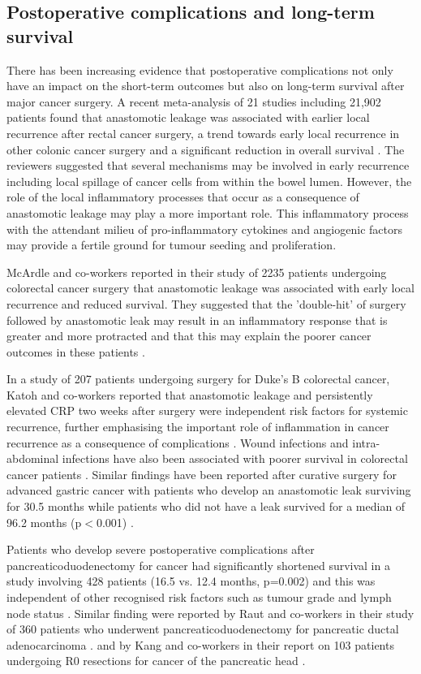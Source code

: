 \subsection{Postoperative complications and long-term survival}
There has been increasing evidence that postoperative complications not only have an impact on the short-term outcomes but also on long-term survival after major cancer surgery. 
A recent meta-analysis of 21 studies including 21,902 patients found that anastomotic leakage was associated with earlier local recurrence after rectal cancer surgery, a trend towards early local recurrence in other colonic cancer surgery and a significant reduction in overall survival \parencite{mirnezami_increased_2011}. 
The reviewers suggested that several mechanisms may be involved in early recurrence including local spillage of cancer cells from within the bowel lumen. 
However, the role of the local inflammatory processes that occur as a consequence of anastomotic leakage may play a more important role. 
This inflammatory process with the attendant milieu of pro-inflammatory cytokines and angiogenic factors may provide a fertile ground for tumour seeding and proliferation.

McArdle and co-workers reported in their study of 2235 patients undergoing colorectal cancer surgery that anastomotic leakage was associated with early local recurrence and reduced survival. 
They suggested that the 'double-hit' of surgery followed by anastomotic leak may result in an inflammatory response that is greater and more protracted and that this may explain the poorer cancer outcomes in these patients \parencite{mcardle_impact_2005}. 

In a study of 207 patients undergoing surgery for Duke's B colorectal cancer, Katoh and co-workers reported that anastomotic leakage and persistently elevated CRP two weeks after surgery were independent risk factors for systemic recurrence, further emphasising the important role of inflammation in cancer recurrence as a consequence of complications \parencite{katoh_anastomotic_2011}. 
Wound infections and intra-abdominal infections have also been associated with poorer survival in colorectal cancer patients \parencite{nespoli_impact_2006}. 
Similar findings have been reported after curative surgery for advanced gastric cancer with patients who develop an anastomotic leak surviving for 30.5 months while patients who did not have a leak survived for a median of 96.2 months (p$<$0.001) \parencite{yoo_negative_2011}. 

Patients who develop severe postoperative complications after pancreaticoduodenectomy for cancer had significantly shortened survival in a study involving 428 patients (16.5 vs. 12.4 months, p=0.002) and this was independent of other recognised risk factors such as tumour grade and lymph node status \parencite{kamphues_postoperative_2012}. 
Similar finding were reported by Raut and co-workers in their study of 360 patients who underwent pancreaticoduodenectomy for pancreatic ductal adenocarcinoma \parencite{raut_impact_2007}. 
and by Kang and co-workers in their report on 103 patients undergoing R0 resections for cancer of the pancreatic head \parencite{kang_detrimental_2009}.

